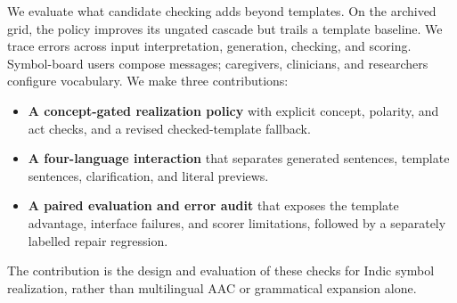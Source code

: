 We evaluate what candidate checking adds beyond templates.
On the archived grid, the policy improves its ungated cascade but trails a template baseline.
We trace errors across input interpretation, generation, checking, and scoring.
Symbol-board users compose messages; caregivers, clinicians, and researchers configure vocabulary.
We make three contributions:
\begin{itemize}
\item \textbf{A concept-gated realization policy} with explicit concept, polarity, and act checks, and a revised checked-template fallback.
\item \textbf{A four-language interaction} that separates generated sentences, template sentences, clarification, and literal previews.
\item \textbf{A paired evaluation and error audit} that exposes the template advantage, interface failures, and scorer limitations, followed by a separately labelled repair regression.
\end{itemize}
The contribution is the design and evaluation of these checks for Indic symbol realization, rather than multilingual AAC or grammatical expansion alone.
